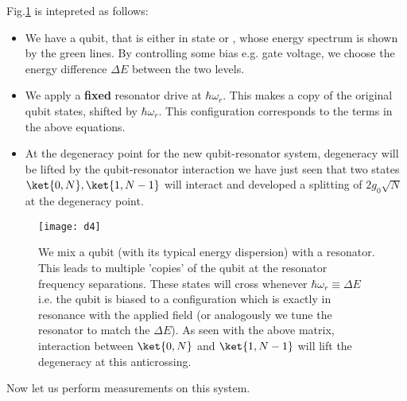 Fig.\ref{qrDresssed} is intepreted as follows:

\begin{itemize}
\item We have a qubit, that  is either in state  or ,
  whose energy spectrum is shown  by the green lines.  By controlling
  some  bias e.g.   gate  voltage, we  choose  the energy  difference
  $ \Delta E $ between the two levels.
\item We apply a \textbf{fixed} resonator drive at $ \hbar\omega_r $.
  This  makes  a  copy  of  the original  qubit  states,  shifted  by
  $  \hbar\omega_r   $.   This   configuration  corresponds   to  the
   terms in the above equations.
\item At  the degeneracy  point for  the new  qubit-resonator system,
  degeneracy will  be lifted by the  qubit-resonator interaction \ira
  we have just  seen that two states $ \ket{0,N},  \ket{1,N-1} $ will
  interact  and developed  a splitting  of  $ 2g_0\sqrt{N}  $ at  the
  degeneracy  point.  
\end{itemize}

\begin{figure}[h]
  \centering%
  \texttt{[image: d4]}
  \caption{We mix a qubit (with its typical energy dispersion) with a
    resonator.  This leads  to multiple 'copies' of the  qubit at the
    resonator  frequency   separations.   These  states   will  cross
    whenever  $  \hbar\omega_r\equiv\Delta E  $  i.e.   the qubit  is
    biased to a configuration which  is exactly in resonance with the
    applied field (or analogously we  tune the resonator to match the
    $ \Delta  E $).  As  seen with  the above matrix,  interaction between
    $\ket{0,N}$ and $ \ket{1,N-1} $  will lift the degeneracy at this
    anticrossing.\label{qrDresssed}}
\end{figure}

Now let us perform measurements on this system.

